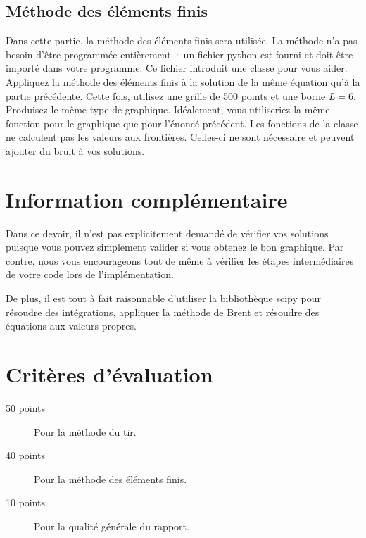 \documentclass{article}
\begin{document}
\subsection{Méthode des éléments finis}

Dans cette partie, la méthode des éléments finis sera utilisée. 
La méthode n’a pas besoin d’être programmée entièrement~:~un fichier python est fourni 
et doit être importé dans votre programme. 
Ce fichier introduit une classe pour vous aider.
Appliquez la méthode des éléments finis à la solution de la même équation qu’à la partie précédente. 
Cette fois, utilisez une grille de 500 points et une borne $L = 6$. 
Produisez le même type de graphique.
Idéalement, vous utiliseriez la même fonction pour le graphique que pour l'énoncé précédent.
Les fonctions de la classe ne calculent pas les valeurs aux frontières. 
Celles-ci ne sont nécessaire et peuvent ajouter du bruit à vos solutions.

\section{Information complémentaire}

Dans ce devoir, il n'est pas explicitement demandé de vérifier vos solutions 
puisque vous pouvez simplement valider si vous obtenez le bon graphique. 
Par contre, nous vous encourageons tout de même à vérifier les étapes intermédiaires 
de votre code lors de l'implémentation. 

De plus, il est tout à fait raisonnable d'utiliser la bibliothèque scipy pour 
résoudre des intégrations, appliquer la méthode de Brent et résoudre des équations
aux valeurs propres.

\section{Critères d'évaluation}

\begin{description}
  \item[50 points] Pour la méthode du tir.
  \item[40 points] Pour la méthode des éléments finis.
  \item[10 points] Pour la qualité générale du rapport.
\end{description}
\end{document}
